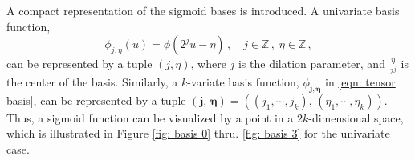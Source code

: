 A compact representation of the sigmoid bases is introduced.
A univariate basis function,
\begin{equation*}
    {\phi}_{j,\eta}(u) = {\phi}(2^j u-\eta) \,,\quad j\in \mathbb{Z} \,,\;\eta \in \mathbb{Z}\,,
    \label{eqn: self similar sigmoid}
\end{equation*}
can be represented by a tuple $(j, \eta)$,
where $j$ is the dilation parameter, and $\frac{\eta}{2^j}$ is
the center of the basis.
Similarly, a $k$-variate basis function, $\phi_{\boldsymbol{j}, \boldsymbol{\eta}}$ in
\eqref{eqn: tensor basis}, can be represented by a tuple $\left(\boldsymbol{j}, \,
\boldsymbol{\eta}\right) 
= \left((j_1,\cdots, j_k), \, \left(\eta_1, \cdots, \eta_k\right)\right)$.
Thus, a sigmoid function can be visualized by a point in a $2k$-dimensional space,
which is illustrated in Figure \ref{fig: basis 0} thru. \ref{fig: basis 3} 
for the univariate case.
